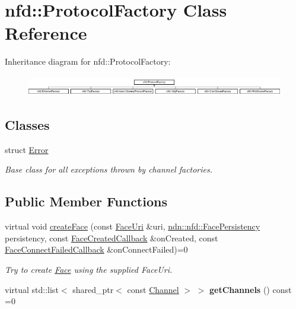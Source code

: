 \hypertarget{classnfd_1_1ProtocolFactory}{}\section{nfd\+:\+:Protocol\+Factory Class Reference}
\label{classnfd_1_1ProtocolFactory}
Inheritance diagram for nfd\+:\+:Protocol\+Factory\+:\begin{figure}[H]
\begin{center}
\leavevmode
\includegraphics[height=0.901771cm]{classnfd_1_1ProtocolFactory}
\end{center}
\end{figure}
\subsection*{Classes}
\begin{DoxyCompactItemize}
\item 
struct \hyperlink{structnfd_1_1ProtocolFactory_1_1Error}{Error}
\begin{DoxyCompactList}\small\item\em Base class for all exceptions thrown by channel factories. \end{DoxyCompactList}\end{DoxyCompactItemize}
\subsection*{Public Member Functions}
\begin{DoxyCompactItemize}
\item 
virtual void \hyperlink{classnfd_1_1ProtocolFactory_ae7399319c46091b401a3de37d0a5b693}{create\+Face} (const \hyperlink{classndn_1_1util_1_1FaceUri}{Face\+Uri} \&uri, \hyperlink{group__management_ga05df4b7c484a0fae25d3e65962511bac}{ndn\+::nfd\+::\+Face\+Persistency} persistency, const \hyperlink{namespacenfd_a6d4b91580c829552a452c53458381b0f}{Face\+Created\+Callback} \&on\+Created, const \hyperlink{namespacenfd_ae87d4f07de26f4939691439b51f2dd83}{Face\+Connect\+Failed\+Callback} \&on\+Connect\+Failed)=0
\begin{DoxyCompactList}\small\item\em Try to create \hyperlink{classnfd_1_1Face}{Face} using the supplied Face\+Uri. \end{DoxyCompactList}\item 
virtual std\+::list$<$ shared\+\_\+ptr$<$ const \hyperlink{classnfd_1_1Channel}{Channel} $>$ $>$ {\bfseries get\+Channels} () const =0\hypertarget{classnfd_1_1ProtocolFactory_aa3b8a669d5a47ea12e4ba249de73fc62}{}\label{classnfd_1_1ProtocolFactory_aa3b8a669d5a47ea12e4ba249de73fc62}

\end{DoxyCompactItemize}


